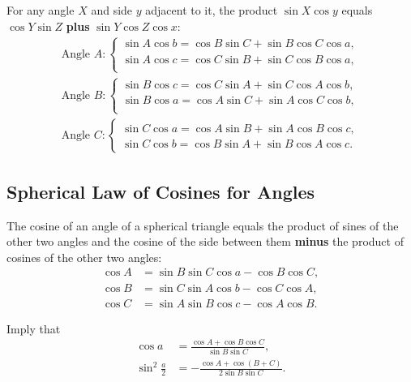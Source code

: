 \documentclass[12pt,a4paper]{memoir}
\theoremstyle{definition}
\begin{document}
	\begin{question}[name=Angle's Sine Times Adjacent Side's Cosine]
		For any angle $X$ and side $y$ adjacent to it, the product $\sin X \cos y$ equals $\cos Y \sin Z$ \textbf{plus} $\sin Y \cos Z \cos x$:
		\begin{align*}
			\text{Angle } A: \begin{cases}
				\sin A \cos b = \cos B \sin C + \sin B \cos C \cos a,\\
				\sin A \cos c = \cos C \sin B + \sin C \cos B \cos a,\\ 
			\end{cases}\\
			\text{Angle } B: \begin{cases}
				\sin B \cos c = \cos C \sin A + \sin C \cos A \cos b,\\
				\sin B \cos a = \cos A \sin C + \sin A \cos C \cos b,\\
			\end{cases}\\
			\text{Angle } C: \begin{cases}
				\sin C \cos a = \cos A \sin B + \sin A \cos B \cos c,\\
				\sin C \cos b = \cos B \sin A + \sin B \cos A \cos c.
			\end{cases}
		\end{align*}
	\end{question}

\subsection{Spherical Law of Cosines for Angles}

	\begin{question}
		The cosine of an angle of a spherical triangle equals the product of sines of the other two angles and the cosine of the side between them \textbf{minus} the product of cosines of the other two angles:
		\begin{align*}
			\cos A &= \sin B \sin C \cos a - \cos B \cos C,\\
			\cos B &= \sin C \sin A \cos b - \cos C \cos A,\\
			\cos C &= \sin A \sin B \cos c - \cos A \cos B.
		\end{align*}
	\end{question}
	\begin{question}
		Imply that
		\begin{align*}
			\cos a &= \frac{\cos A + \cos B\cos C}{\sin B \sin C},\\
			\sin^2\frac{a}{2} &= -\frac{\cos A + \cos(B+C)}{2\sin B \sin C}. 
		\end{align*}
	\end{question}
\end{document}
